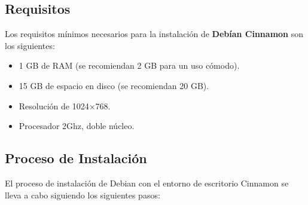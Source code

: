 				
			\subsection{Requisitos}
				
				Los requisitos mínimos necesarios para la instalación de \textbf{Debían Cinnamon} son los siguientes:
				
				\begin{itemize}
					
					\item 1 GB de RAM (se recomiendan 2 GB para un uso cómodo).
					\item 15 GB de espacio en disco (se recomiendan 20 GB).
					\item Resolución de 1024×768.
					\item Procesador 2Ghz, doble núcleo.
					
				\end{itemize}
			
			\subsection{Proceso de Instalación}
			
			El proceso de instalación de Debian con el entorno de escritorio Cinnamon se lleva a cabo siguiendo los siguientes pasos:
			
